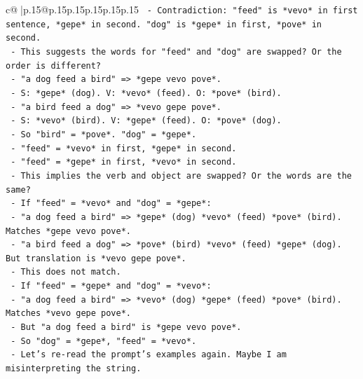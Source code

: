 \documentclass{article}
\begin{document}
{\begin{supertabular}{c@{$\;$}|p{.15\linewidth}@{}p{.15\linewidth}p{.15\linewidth}p{.15\linewidth}p{.15\linewidth}p{.15\linewidth}}
{{{\texttt{                    {-}   Contradiction: "feed" is *vevo* in first sentence, *gepe* in second. "dog" is *gepe* in first, *pove* in second.} \\
\texttt{                    {-}   This suggests the words for "feed" and "dog" are swapped? Or the order is different?} \\
\texttt{                    {-}   "a dog feed a bird" => *gepe vevo pove*.} \\
\texttt{                        {-}   S: *gepe* (dog). V: *vevo* (feed). O: *pove* (bird).} \\
\texttt{                    {-}   "a bird feed a dog" => *vevo gepe pove*.} \\
\texttt{                        {-}   S: *vevo* (bird). V: *gepe* (feed). O: *pove* (dog).} \\
\texttt{                    {-}   So "bird" = *pove*. "dog" = *gepe*.} \\
\texttt{                    {-}   "feed" = *vevo* in first, *gepe* in second.} \\
\texttt{                    {-}   "feed" = *gepe* in first, *vevo* in second.} \\
\texttt{                    {-}   This implies the verb and object are swapped? Or the words are the same?} \\
\texttt{                    {-}   If "feed" = *vevo* and "dog" = *gepe*:} \\
\texttt{                        {-}   "a dog feed a bird" => *gepe* (dog) *vevo* (feed) *pove* (bird). Matches *gepe vevo pove*.} \\
\texttt{                        {-}   "a bird feed a dog" => *pove* (bird) *vevo* (feed) *gepe* (dog). But translation is *vevo gepe pove*.} \\
\texttt{                        {-}   This does not match.} \\
\texttt{                    {-}   If "feed" = *gepe* and "dog" = *vevo*:} \\
\texttt{                        {-}   "a dog feed a bird" => *vevo* (dog) *gepe* (feed) *pove* (bird). Matches *vevo gepe pove*.} \\
\texttt{                        {-}   But "a dog feed a bird" is *gepe vevo pove*.} \\
\texttt{                        {-}   So "dog" = *gepe*, "feed" = *vevo*.} \\
\texttt{                    {-}   Let's re{-}read the prompt's examples again. Maybe I am misinterpreting the string.} \\
}}}
\end{supertabular}}
\end{document}
